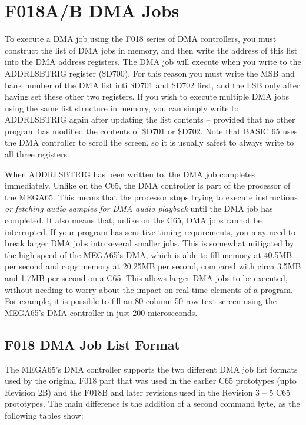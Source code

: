 \section{F018A/B DMA Jobs}

To execute a DMA job using the F018 series of DMA controllers, you must construct the list of DMA jobs in memory,
and then write the address of this list into the DMA address registers.  The DMA job will execute when you write to
the ADDRLSBTRIG register (\$D700).  For this reason you must write the MSB and bank number of the DMA list inti \$D701 and \$D702 first,
and the LSB only after having set these other two registers.  If you wish to execute multiple DMA jobs using the same
list structure in memory, you can simply write to ADDRLSBTRIG again after updating the list contents -- provided that
no other program has modified the contents of \$D701 or \$D702.  Note that BASIC 65 uses the DMA controller to
scroll the screen, so it is usually safest to always write to all three registers.

When ADDRLSBTRIG has been written to, the DMA job completes immediately.  Unlike on the C65, the DMA controller is part
of the processor of the MEGA65. This means that the processor stops trying to execute instructions {\em or fetching audio samples for DMA audio playback} until the DMA job
has completed.  It also means that, unlike on the C65, DMA jobs cannot be interrupted. If your program has sensitive timing
requirements, you may need to break larger DMA jobs into several smaller jobs.  This is somewhat mitigated by the high
speed of the MEGA65's DMA, which is able to fill memory at 40.5MB per second and copy memory at 20.25MB per second, compared
with circa 3.5MB and 1.7MB per second on a C65. This allows larger DMA jobs to be executed, without needing to worry about
the impact on real-time elements of a program. For example, it is possible to fill an 80 column 50 row text screen using the
MEGA65's DMA controller in just 200 microseconds.

\subsection{F018 DMA Job List Format}

The MEGA65's DMA controller supports the two different DMA job list formats used by the original F018 part that
was used in the earlier C65 prototypes (upto Revision 2B) and the F018B and later revisions used in the Revision 3 -- 5
C65 prototypes.  The main difference is the addition of a second command byte, as the following tables show:

